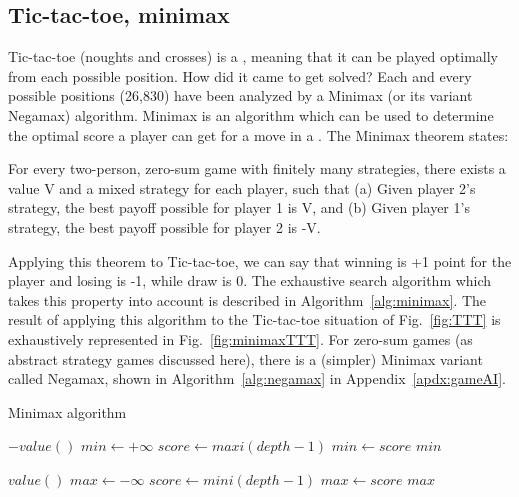 \subsection{Tic-tac-toe, minimax}
Tic-tac-toe (noughts and crosses) is a , meaning that it can be played optimally from each possible position. How did it came to get solved? Each and every possible positions (26,830) have been analyzed by a Minimax (or its variant Negamax) algorithm. Minimax is an algorithm which can be used to determine the optimal score a player can get for a move in a . The Minimax theorem states:
\begin{mythm}
For every two-person, zero-sum game with finitely many strategies, there exists a value V and a mixed strategy for each player, such that (a) Given player 2's strategy, the best payoff possible for player 1 is V, and (b) Given player 1's strategy, the best payoff possible for player 2 is -V.
\end{mythm}
Applying this theorem to Tic-tac-toe, we can say that winning is +1 point for the player and losing is -1, while draw is 0. The exhaustive search algorithm which takes this property into account is described in Algorithm~\ref{alg:minimax}. The result of applying this algorithm to the Tic-tac-toe situation of Fig.~\ref{fig:TTT} is exhaustively represented in Fig.~\ref{fig:minimaxTTT}. For zero-sum games (as abstract strategy games discussed here), there is a (simpler) Minimax variant called Negamax, shown in Algorithm~\ref{alg:negamax} in Appendix~\ref{apdx:gameAI}.
\begin{algorithm}
\caption{Minimax algorithm}
\label{alg:minimax}
\begin{algorithmic}
        \State \Return $-value()$
    \EndIf
    \State $min \gets +\infty$
        \State $score \gets maxi(depth-1)$
            \State $min \gets score$
        \EndIf 
    \EndFor
    \State \Return $min$
\EndFunction

        \State \Return $value()$
    \EndIf
    \State $max \gets -\infty$
        \State $score \gets mini(depth-1)$
            \State $max \gets score$
        \EndIf
    \EndFor 
    \State \Return $max$
\EndFunction
\end{algorithmic}
\end{algorithm}


